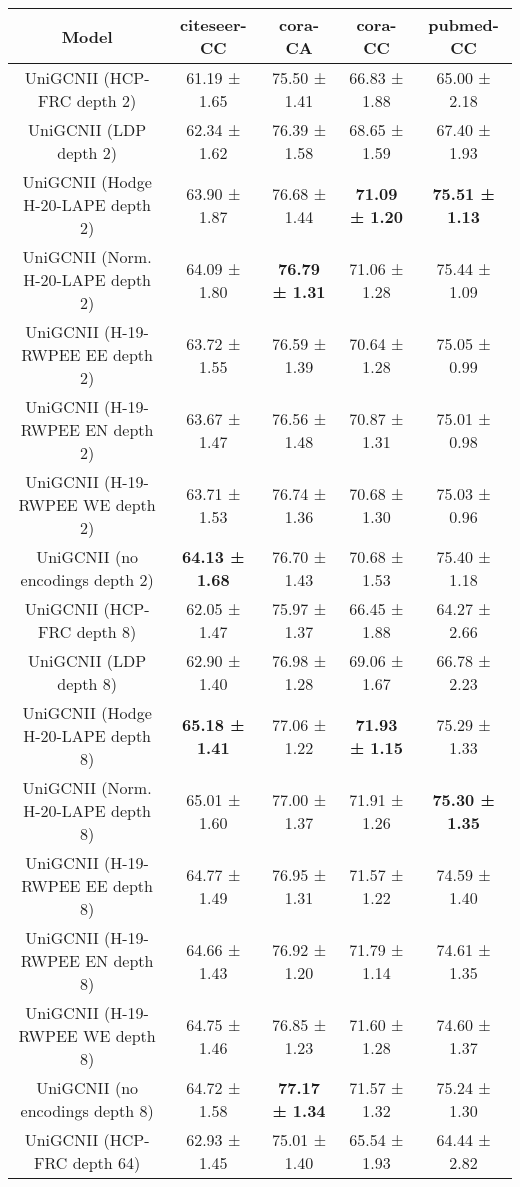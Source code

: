 \begin{table}[H]
\tiny
\centering
\begin{tabular}{|c|c|c|c|c|}
\hline
Model & citeseer-CC & cora-CA & cora-CC & pubmed-CC \\
\hline
UniGCNII (HCP-FRC depth 2) & 61.19 ± 1.65 & 75.50 ± 1.41 & 66.83 ± 1.88 & 65.00 ± 2.18 \\
UniGCNII (LDP depth 2) & 62.34 ± 1.62 & 76.39 ± 1.58 & 68.65 ± 1.59 & 67.40 ± 1.93 \\
UniGCNII (Hodge H-20-LAPE depth 2) & 63.90 ± 1.87 & 76.68 ± 1.44 & \textbf{71.09 ± 1.20} & \textbf{75.51 ± 1.13} \\
UniGCNII (Norm. H-20-LAPE depth 2) & 64.09 ± 1.80 & \textbf{76.79 ± 1.31} & 71.06 ± 1.28 & 75.44 ± 1.09 \\
UniGCNII (H-19-RWPEE EE depth 2) & 63.72 ± 1.55 & 76.59 ± 1.39 & 70.64 ± 1.28 & 75.05 ± 0.99 \\
UniGCNII (H-19-RWPEE EN depth 2) & 63.67 ± 1.47 & 76.56 ± 1.48 & 70.87 ± 1.31 & 75.01 ± 0.98 \\
UniGCNII (H-19-RWPEE WE depth 2) & 63.71 ± 1.53 & 76.74 ± 1.36 & 70.68 ± 1.30 & 75.03 ± 0.96 \\
\hline
UniGCNII (no encodings depth 2) & \textbf{64.13 ± 1.68} & 76.70 ± 1.43 & 70.68 ± 1.53 & 75.40 ± 1.18 \\
\hline
\hline
UniGCNII (HCP-FRC depth 8) & 62.05 ± 1.47 & 75.97 ± 1.37 & 66.45 ± 1.88 & 64.27 ± 2.66 \\
UniGCNII (LDP depth 8) & 62.90 ± 1.40 & 76.98 ± 1.28 & 69.06 ± 1.67 & 66.78 ± 2.23 \\
UniGCNII (Hodge H-20-LAPE depth 8) & \textbf{65.18 ± 1.41} & 77.06 ± 1.22 & \textbf{71.93 ± 1.15} & 75.29 ± 1.33 \\
UniGCNII (Norm. H-20-LAPE depth 8) & 65.01 ± 1.60 & 77.00 ± 1.37 & 71.91 ± 1.26 & \textbf{75.30 ± 1.35} \\
UniGCNII (H-19-RWPEE EE depth 8) & 64.77 ± 1.49 & 76.95 ± 1.31 & 71.57 ± 1.22 & 74.59 ± 1.40 \\
UniGCNII (H-19-RWPEE EN depth 8) & 64.66 ± 1.43 & 76.92 ± 1.20 & 71.79 ± 1.14 & 74.61 ± 1.35 \\
UniGCNII (H-19-RWPEE WE depth 8) & 64.75 ± 1.46 & 76.85 ± 1.23 & 71.60 ± 1.28 & 74.60 ± 1.37 \\
\hline
UniGCNII (no encodings depth 8) & 64.72 ± 1.58 & \textbf{77.17 ± 1.34} & 71.57 ± 1.32 & 75.24 ± 1.30 \\
\hline
\hline
UniGCNII (HCP-FRC depth 64) & 62.93 ± 1.45 & 75.01 ± 1.40 & 65.54 ± 1.93 & 64.44 ± 2.82 \\

\end{tabular}
\end{table}
